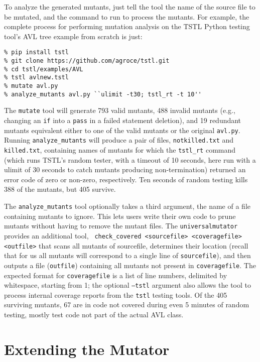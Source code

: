 To analyze the generated mutants, just tell the tool the name of the
source file to be mutated, and the command to run to process the
mutants.  For example, the complete process for performing mutation
analysis on the TSTL \cite{tstlsttt,nfm15} Python testing tool's AVL tree example from scratch is just:

{\scriptsize
\begin{verbatim}
% pip install tstl
% git clone https://github.com/agroce/tstl.git
% cd tstl/examples/AVL
% tstl avlnew.tstl
% mutate avl.py
% analyze_mutants avl.py ``ulimit -t30; tstl_rt -t 10''
\end{verbatim}
}

The {\tt mutate} tool will generate 793 valid mutants, 488 invalid
mutants (e.g., changing an {\tt if} into a {\tt pass} in a failed
statement deletion), and 19 redundant mutants equivalent either to one
of the valid mutants or the original {\tt avl.py}.
Running {\tt analyze\_mutants} will produce a pair of files, {\tt notkilled.txt} and {\tt
  killed.txt}, containing names of mutants for which the {\tt tstl\_rt}
command (which runs TSTL's random tester, with a timeout of 10
seconds, here run with a ulimit of 30 seconds to catch mutants
producing non-termination)
returned an error code of zero or non-zero, respectively.  Ten seconds
of random testing kills 388 of the mutants, but 405 survive.

The {\tt analyze\_mutants} tool optionally takes a third argument, the
name of a file containing mutants to ignore.  This lets users write
their own code to prune mutants without having to remove the mutant
files.  The {\tt universalmutator} provides an additional tool, {\tt
  check\_covered <sourcefile> <coveragefile> <outfile>} that scans all
mutants of sourcefile, determines their location (recall that for us all mutants will correspond to a single line
of {\tt sourcefile}), and then outputs a file ({\tt outfile})
containing all mutants not present in {\tt coveragefile}.  The
expected format for {\tt coveragefile} is a list of line numbers,
delimited by whitespace, starting from 1; the optional {\tt --tstl}
argument also allows the tool to process internal coverage reports
from the {\tt tstl} testing tools.  Of the 405 surviving mutants, 67
are in code not covered during even 5 minutes of random testing, mostly test code not part of the actual AVL class.

\section{Extending the Mutator}

